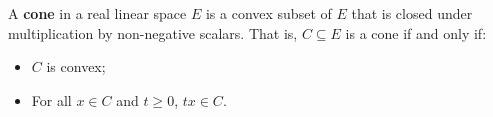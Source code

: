 A \textbf{cone} in a real linear space $E$ is a convex subset of $E$ that is closed under multiplication by non-negative scalars. That is, $C \subseteq E$ is a cone if and only if:
\begin{itemize}
  \item $C$ is convex;
  \item For all $x \in C$ and $t \geq 0$, $tx \in C$.
\end{itemize}
